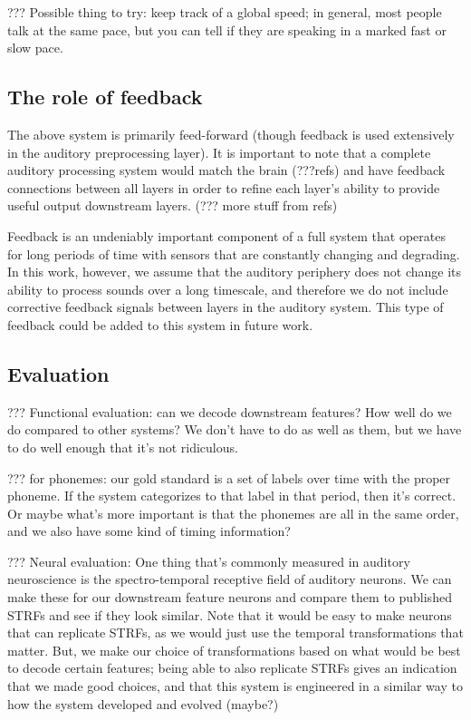 ??? Possible thing to try: keep track of a global
speed; in general, most people talk at the same pace,
but you can tell if they are speaking in a
marked fast or slow pace.

\subsection{The role of feedback}

The above system is primarily feed-forward
(though feedback is used extensively in the
auditory preprocessing layer).
It is important to note that
a complete auditory processing system
would match the brain (???refs) and have
feedback connections between all layers
in order to refine each layer's ability
to provide useful output downstream layers.
(??? more stuff from refs)

Feedback is an undeniably important
component of a full system that operates
for long periods of time with sensors
that are constantly changing and degrading.
In this work, however, we assume
that the auditory periphery does not change
its ability to process sounds over a long timescale,
and therefore we do not include corrective feedback
signals between layers in the auditory system.
This type of feedback could be added
to this system in future work.

\subsection{Evaluation}

??? Functional evaluation: can we decode downstream features?
How well do we do compared to other systems?
We don't have to do as well as them,
but we have to do well enough that it's not ridiculous.

??? for phonemes: our gold standard is a set of labels
over time with the proper phoneme.
If the system categorizes to that label in that period,
then it's correct. Or maybe what's more important
is that the phonemes are all in the same order,
and we also have some kind of timing information?

??? Neural evaluation: One thing that's commonly measured
in auditory neuroscience is the spectro-temporal receptive field
of auditory neurons. We can make these for our downstream feature
neurons and compare them to published STRFs and see if they look similar.
Note that it would be easy to make neurons that can replicate STRFs,
as we would just use the temporal transformations that matter.
But, we make our choice of transformations based on what would
be best to decode certain features;
being able to also replicate STRFs gives an indication that
we made good choices, and that this system is engineered
in a similar way to how the system developed and evolved (maybe?)

